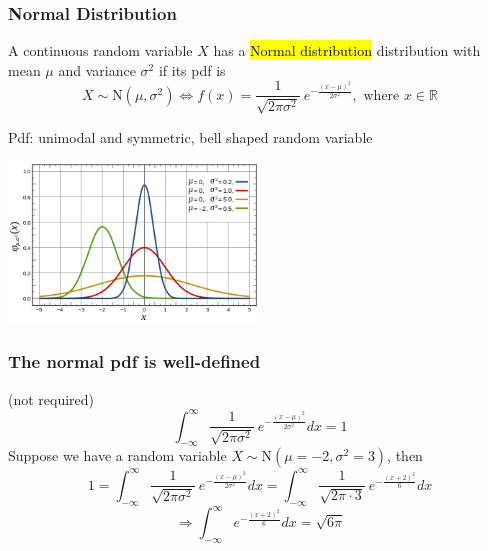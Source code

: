 \documentclass[slidestop,compress,mathserif]{beamer}
\begin{document}
\begin{frame}
\frametitle{Normal Distribution}

\vspace{-0.2cm}
\begin{defn}
A continuous random variable $X$ has a \hl{Normal distribution} distribution with mean $\mu$ and variance $\sigma^2$ if its pdf is
\[
X \sim \text{N}(\mu, \sigma^2) \Longleftrightarrow
 f(x) = \frac{1}{\sqrt{2\pi\sigma^2}}~e^{ -\frac{(x-\mu)^2}{2\sigma^2} }, \text{ where } x \in \mathbb{R}
\]
\end{defn}

Pdf: unimodal and symmetric, bell shaped random variable
\begin{center}
\includegraphics[width = 0.5\textwidth]{figures/normal_pdf}
\end{center}

\end{frame}


%
%


\begin{frame}\frametitle{The normal pdf is well-defined} %
({\color{red}not required})
\[\int_{-\infty}^\infty \frac{1}{\sqrt{2\pi\sigma^2}}~e^{ -\frac{(x-\mu)^2}{2\sigma^2} } dx =1 \]
\pause
Suppose we have a random variable $X \sim \text{N}(\mu = -2, \sigma^2 = 3)$, then
\[
1  = \int_{-\infty}^\infty \frac{1}{\sqrt{2\pi\sigma^2}}~e^{ -\frac{(x-\mu)^2}{2\sigma^2} } dx
 = \int_{-\infty}^{\infty} \frac{1}{\sqrt{2 \pi \cdot 3}}~e^{-\frac{(x +2 )^2}{6}}dx\]
 \[\Longrightarrow \int_{-\infty}^{\infty} e^{-\frac{(x + 2)^2}{6}}dx = \sqrt{6\pi}\]




\end{frame}
\end{document}

